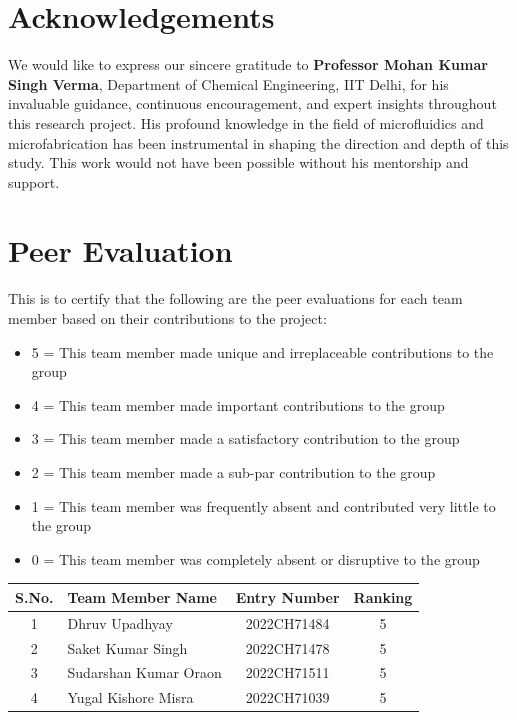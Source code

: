 \documentclass[12pt,a4paper]{article}
\begin{document}
\pagestyle{fancy}

\newpage
\section*{Acknowledgements}

\vspace{0.5cm}

\noindent We would like to express our sincere gratitude to \textbf{Professor Mohan Kumar Singh Verma}, Department of Chemical Engineering, IIT Delhi, for his invaluable guidance, continuous encouragement, and expert insights throughout this research project. His profound knowledge in the field of microfluidics and microfabrication has been instrumental in shaping the direction and depth of this study. This work would not have been possible without his mentorship and support.

\vspace{0.5cm}

\section*{Peer Evaluation}

\noindent This is to certify that the following are the peer evaluations for each team member based on their contributions to the project:
\begin{itemize}
  \item 5 = This team member made unique and irreplaceable contributions to the group
  \item 4 = This team member made important contributions to the group
  \item 3 = This team member made a satisfactory contribution to the group
  \item 2 = This team member made a sub-par contribution to the group
  \item 1 = This team member was frequently absent and contributed very little to the group
  \item 0 = This team member was completely absent or disruptive to the group
\end{itemize}

\vspace{1em}

\begin{table}[h]
\centering
\begin{tabular}{clcc}
\toprule
\textbf{S.No.} & \textbf{Team Member Name} & \textbf{Entry Number} & \textbf{Ranking} \\
\midrule
1 & Dhruv Upadhyay & 2022CH71484 & 5 \\
2 & Saket Kumar Singh & 2022CH71478 & 5 \\
3 & Sudarshan Kumar Oraon & 2022CH71511 & 5 \\
4 & Yugal Kishore Misra & 2022CH71039 & 5 \\
\bottomrule
\end{tabular}
\end{table}
\end{document}
